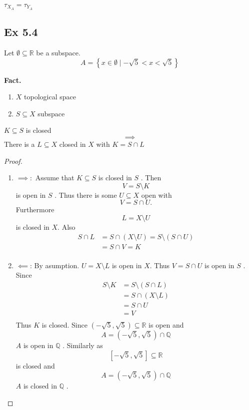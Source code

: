 \documentclass{article}
\theoremstyle{remark}
\begin{document}
$\tau _{X_{A}} = \tau _{Y_{A}}$


\subsection*{Ex 5.4}%
\label{sub:ex_4}

Let $\emptyset  \subseteq  \mathbb{R} $ be a subspace. \[
A = \left\{ x \in  \emptyset   \mid  - \sqrt{5}  < x < \sqrt{5}  \right\}
\]

\textbf{Fact.}
\begin{enumerate}[label=(\roman*)]
    \item $X $  topological space
    \item $S \subseteq X$  subspace
\end{enumerate}

$K \subseteq S$  is closed \[
\implies
\]
There is a $L \subseteq  X$  closed in $X$  with $K = S \cap L$


\begin{proof}
    \begin{enumerate}[label=(\roman*)]
        \item $\implies :$  Assume that $K \subseteq  S$  is closed in $S$ . Then \[
        V  = S \setminus K
        \]
        is open in $S$ . Thus there is some $U \subseteq  X$  open with \[
        V = S \cap U.
        \] Furthermore \[
        L = X \setminus  U
        \]
        is closed in $X$. Also \[
            \begin{split}
        S \cap  L  & = S \cap \left( X \setminus U \right) = S \setminus \left( S \cap U \right) \\
        &= S \cap V = K \\
            \end{split}
        \]
    \item $\impliedby $: By asumption. $U = X \setminus L$ is open in $X$. Thus $V = S\cap U $ is open in $S$ . Since \[
            \begin{split}
            S \setminus K &= S \setminus \left( S \cap L \right)  \\
            &= S \cap \left( X \setminus L \right) \\
            &= S \cap U \\
            &= V \\
            \end{split}
    \]
    Thus $K$  is closed. Since $\left( - \sqrt{5}, \sqrt{5}   \right) \subseteq \mathbb{R} $ is open and \[
    A = \left( -\sqrt{5} , \sqrt{5}  \right) \cap \mathbb{Q}
    \]
    $A $  is open in $\mathbb{Q} $ . Similarly as \[
    \left[ - \sqrt{5} , \sqrt{5}  \right] \subseteq \mathbb{R}
    \]
    is closed and  \[
    A = \left( -\sqrt{5}  , \sqrt{5}  \right) \cap  \mathbb{Q}
    \]
    $A$  is closed in $\mathbb{Q} $ .
    \end{enumerate}
\end{proof}
\end{document}
